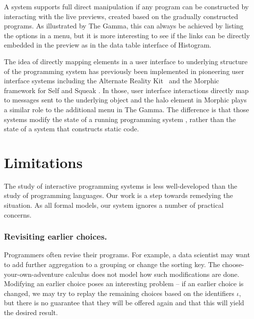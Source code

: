 \documentclass[nonacm,anonymous,sigplan,screen]{acmart}
\newcommand{\ident}[1]{\textsf{\color{DarkSlateBlue}{#1}}}
\newcommand{\select}{\textnormal{\ident{choose}}}
\newcommand{\todo}[1]{\textcolor{red}{\textbf{TODO: #1}}}
\begin{document}
A system supports full direct manipulation if any program can be constructed by interacting with
the live previews, created based on the gradually constructed programs. As illustrated by The Gamma,
this can always be achieved by listing the options in a menu, but it is more interesting to see
if the links can be directly embedded in the preview as in the data table interface of Histogram.


The idea of directly mapping elements in a user interface to underlying structure of the
programming system has previously been implemented in pioneering user interface systems
including the Alternate Reality Kit~\cite{smith-1986-ark} and the Morphic framework for
Self and Squeak \cite{maloney-1995-morphic,maloney-2001-morphic}. In those, user interface
interactions directly map to messages sent to the underlying object and the halo element in
Morphic plays a similar role to the additional menu in The Gamma. The difference is that those
systems modify the state of a running programming system \cite{jakubovic-2023-techdims}, rather
than the state of a system that constructs static code.

\section{Limitations}
\label{sec:limitations}


The study of interactive programming systems is less well-developed than the study
of programming languages. Our work is a step towards remedying the situation.
As all formal models, our system ignores a number of practical concerns.

\subsubsection*{Revisiting earlier choices.}
Programmers often revise their programs. For example, a data
scientist may want to add further aggregation to a grouping or change the sorting key.
The choose-your-own-adventure calculus does not model how such modifications are done.
Modifying an earlier choice poses an interesting problem -- if an earlier choice is
changed, we may try to replay the remaining choices based on the identifiers $\iota$,
but there is no guarantee that they will be offered again and that this will yield the
desired result.
\end{document}
